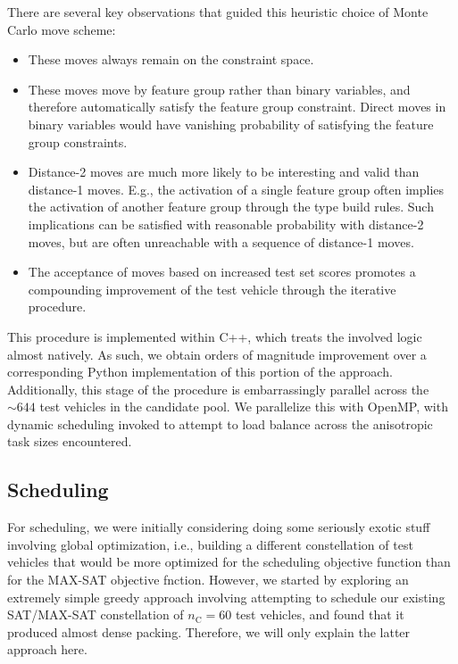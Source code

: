 \documentclass[aps,prl,twocolumn,superscriptaddress,groupedaddress]{revtex4}  %
\begin{document}
There are several key observations that guided this heuristic choice of Monte
Carlo move scheme:
\begin{itemize}
\item These moves always remain on the constraint space.
\item These moves move by feature group rather than binary variables, and
therefore automatically satisfy the feature group constraint. Direct moves in
binary variables would have vanishing probability of satisfying the feature
group constraints.
\item Distance-2 moves are much more likely to be interesting and valid than
distance-1 moves. E.g., the activation of a single feature group often implies
the activation of another feature group through the type build rules. Such
implications can be satisfied with reasonable probability with distance-2 moves,
but are often unreachable with a sequence of distance-1 moves.
\item The acceptance of moves based on increased test set scores promotes a
compounding improvement of the test vehicle through the iterative procedure.
\end{itemize}

This procedure is implemented within C++, which treats the involved logic almost
natively. As such, we obtain orders of magnitude improvement over a
corresponding Python implementation of this portion of the approach.
Additionally, this stage of the procedure is embarrassingly parallel across the
$\sim 644$ test vehicles in the candidate pool. We parallelize this with OpenMP,
with dynamic scheduling invoked to attempt to load balance across the
anisotropic task sizes encountered.


\subsection{Scheduling}

For scheduling, we were initially considering doing some seriously exotic stuff
involving global optimization, i.e., building a different constellation of test
vehicles that would be more optimized for the scheduling objective function than
for the MAX-SAT objective fnction. However, we started by exploring an extremely
simple greedy approach involving attempting to schedule our existing SAT/MAX-SAT
constellation of $n_{\mathrm{C}} = 60$ test vehicles, and found that it produced
almost dense packing. Therefore, we will only explain the latter approach here. 
\end{document}
